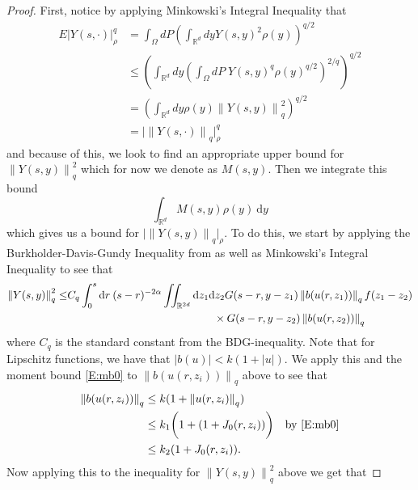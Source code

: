 \documentclass[a4paper,11pt]{article}
\numberwithin{equation}{section}
\theoremstyle{plain}
\theoremstyle{definition}
\newcommand{\R}{\mathbb{R}}
\newcommand{\Norm}[1]{\left\|  #1   \right\|}
\newcommand{\ud}{\ensuremath{\mathrm{d}}}
\begin{document}
\begin{proof} First, notice by applying Minkowski's Integral Inequality that 
\begin{align*}
E |Y(s,\cdot)|_{\rho}^q &= \int_\Omega dP \left(\int_{\R^d} dy Y(s,y)^2\rho(y) \right)^{q/2} 
\\ &\le \left(\int_{\R^d}dy \left( \int_\Omega dP \; Y(s,y)^q \rho(y)^{q/2} \right)^{2/q}\right)^{q/2} 
\\ &= \left(\int_{\R^d}dy \rho(y) \Norm{ Y(s,y) }_q^2 \right)^{q/2}
\\ &= \big| \Norm{ Y(s,\cdot) }_q \big|_\rho^q
\end{align*}
and because of this, we look to find an appropriate upper bound for $\Norm{Y(s,y)}^2_q$ which for now we denote as
$M(s,y)$. Then we integrate this bound $$ \int_{\R^d}M(s,y)\rho(y)\:\ud y$$ which gives us a bound for $\big|
\Norm{Y(s,y)}_q\big|_\rho$. To do this, we start by applying the Burkholder-Davis-Gundy Inequality from
\cite{DalangEtc09Minicourse} as well as Minkowski's Integral Inequality to see that
\begin{align*}
	\Norm{Y(s,y)}_q^2 \le & C_q \int_0^s \ud r \: (s-r)^{-2\alpha} \iint_{\R^{2d}} \ud z_1\ud z_2 G(s-r,y-z_1)
	\Norm{b(u(r,z_1))}_q f(z_1-z_2)\\
	&\hspace{13.5em} \times  G(s-r,y-z_2) \Norm{b(u(r,z_2))}_q
\end{align*}
where $C_q$ is the standard constant from the BDG-inequality. Note that for Lipschitz functions, we have that
$|b(u)|<k(1+|u|)$. We apply this and the moment bound \eqref{E:mb0} to $\Norm{b(u(r,z_i))}_q$ above to see that 
\begin{align*}
	\Norm{b(u(r,z_i))}_q  
	   & \le k(1+\Norm{u(r,z_i)}_q)
	\\ & \le k_1\bigg(1+(1+J_0(r,z_i))\bigg) \quad \text{by \eqref{E:mb0}}
	\\ & \le k_2(1+J_0(r,z_i)).
\end{align*}
Now applying this to the inequality for $\Norm{Y(s,y)}_q^2$ above we get that 


\end{proof}
\end{document}
